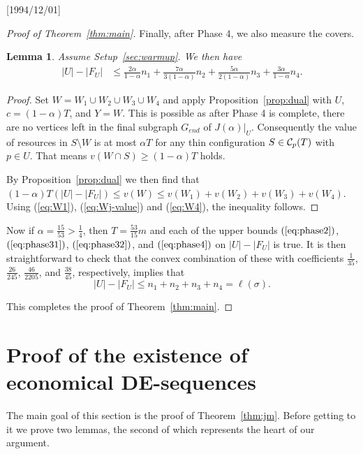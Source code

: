 \NeedsTeXFormat{LaTeX2e}[1994/12/01]\documentclass[letterpaper, 11pt]{article}
\newtheorem{lem}[thm]{Lemma}
\theoremstyle{definition}
\theoremstyle{remark}
\numberwithin{equation}{section}
\begin{document}
\begin{proof}[Proof of Theorem~\ref{thm:main}]
Finally, after Phase 4, we also measure the covers. 

\begin{lem} Assume Setup~\ref{sec:warmup}. We then have
  \begin{align} \label{eq:phase4}
    |U|-|F_U| & \leq  \frac{2\alpha}{1-\alpha}n_1+\frac{7\alpha}{3(1-\alpha)}n_{2} 
  +\frac{5\alpha}{2(1-\alpha)}n_{3}+\frac{3\alpha}{1-\alpha}n_4.
\end{align}
\end{lem}
\begin{proof}
Set $W=W_1\cup W_2\cup W_3\cup W_4$ and apply
Proposition~\ref{prop:dual} with $U$, $c=(1-\alpha)T$, and
$Y=W$.
This is possible as after Phase 4 is
complete, there are no vertices left in the final subgraph $G_{end}$ of
$J(\alpha)|_U$. Consequently the value of resources in
$S\setminus W$ is at most $\alpha T$ for any thin configuration
$S \in {\cal C}_p(T)$ with $p\in U$. That means
$v(W\cap S) \geq (1-\alpha)T$ holds.

By Proposition~\ref{prop:dual} we then find that
$(1-\alpha)T(|U|-|F_U|) \leq v(W) \leq v(W_1) + v(W_2) + v(W_3) + v(W_4)$.
Using (\ref{eq:W1}), (\ref{eq:Wj-value}) and (\ref{eq:W4}), the inequality follows.
\end{proof}

Now if $\alpha= \frac{15}{53}  > \frac{1}{4}$, then $T = \frac{53}{15} m$ and each of the
upper bounds
$(\ref{eq:phase2})$, $(\ref{eq:phase31})$,
$(\ref{eq:phase32})$, and $(\ref{eq:phase4})$ on $|U| - |F_U|$ is true. It is then straightforward to check that the convex
combination of these with coefficients  
$\frac{1}{35}$, $\frac{26}{245}$, $\frac{46}{2205}$, and
$\frac{38}{45}$, respectively, implies that $$|U|-|F_U| \leq 
n_1+n_2+n_3+n_4 = \ell (\sigma).$$

This completes the proof of Theorem~\ref{thm:main}.
\end{proof}

\section{Proof of the existence of economical
  DE-sequences} \label{sec:proofs}


The main goal of this section is the proof of
Theorem~\ref{thm:jm}. Before getting to it we prove two lemmas, the
second of which represents the heart of our argument.  
  
\end{document}
